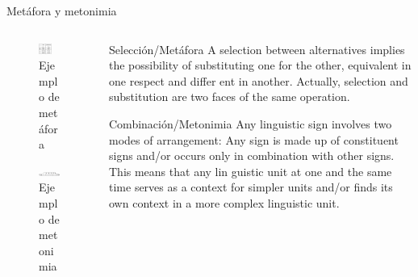 \documentclass[presentation]{beamer}
\begin{document}
\begin{frame}[label={sec:orgdaa1b50}]{Metáfora y metonimia}
\begin{columns}
\begin{column}{0.48\columnwidth}
\begin{figure}
    \includegraphics[width=0.6\textwidth]{./assets/ejemplo_metafora.png}
\caption{Ejemplo de metáfora}
 \end{figure}

 \begin{figure}
    \includegraphics[width=\textwidth]{./assets/ejemplo_metonimia.png}
\caption{Ejemplo de metonimia}
 \end{figure}
\end{column}


\begin{column}{0.48\columnwidth}
\tiny

      \begin{block}{Selección/Metáfora}
A selection between alternatives implies the possibility
of substituting one for the other, equivalent in one respect and differ­
ent in another. Actually, selection and substitution are two faces of the
same operation. \cite[p.98]{jakobson1956two}


   \end{block}

   \begin{block}{Combinación/Metonimia}
Any linguistic sign involves two modes of arrangement: Any sign is made up of constituent signs and/or
occurs only in combination with other signs. This means that any lin­
guistic unit at one and the same time serves as a context for simpler
units and/or finds its own context in a more complex linguistic unit.
\cite[p.99]{jakobson1956two}
   \end{block}



\normalsize
\end{column}
\end{columns}
\end{frame}
\end{document}
